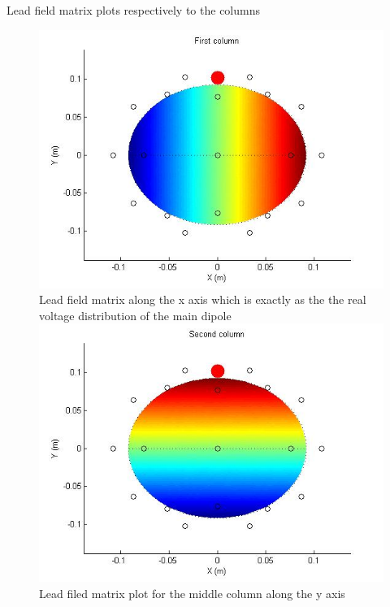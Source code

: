 \documentclass[t,12pt,english
\ifx\beamermode\undefined\else,\beamermode\fi
]{beamer}
\begin{document}
\begin{frame}{Lead field matrix plots respectively to the columns}



\begin{figure}[!htbp]
%
\centering
\includegraphics[width=1\textwidth]{6.jpg}\\
\tiny{Lead field matrix along the x axis which is exactly as the the real voltage distribution of the main dipole}
\endminipage\hfill
{}%
\centering
\includegraphics[width=1\textwidth]{7.jpg}\\
\tiny{Lead filed matrix plot for the middle column along the y axis}
\endminipage\hfill
{}%

\end{figure}
\end{frame}
\end{document}

